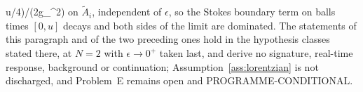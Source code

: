 u/4)/(2g_{}^2)\) on \(\tilde A_i\), independent of \(\epsilon\), so the Stokes boundary term on balls times \([0,u]\) decays and both sides of the limit are dominated. The statements of this paragraph and of the two preceding ones hold in the hypothesis classes stated there, at \(N=2\) with \(\epsilon\to0^+\) taken last, and derive no signature, real-time response, background or continuation; Assumption~\ref{ass:lorentzian} is not discharged, and Problem~E remains open and PROGRAMME-CONDITIONAL.
